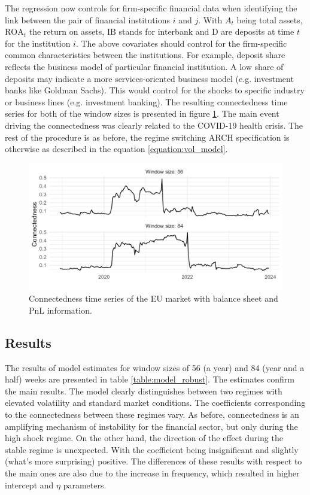 \documentclass[12pt]{article}
\begin{document}
The regression now controls for firm-specific financial data when identifying the link between the pair of financial institutions $i$ and $j$. With $A_t$ being total assets, $\text{ROA}_t$ the return on assets, $\text{IB}$ stands for interbank and $\text{D}$ are deposits at time $t$ for the institution $i$. The above covariates should control for the firm-specific common characteristics between the institutions. For example, deposit share reflects the business model of particular financial institution. A low share of deposits may indicate a more services-oriented business model (e.g. investment banks like Goldman Sachs). This would control for the shocks to specific industry or business lines (e.g. investment banking). The resulting connectedness time series for both of the window sizes is presented in figure \ref{figure:connect_bs}. The main event driving the connectedness was clearly related to the COVID-19 health crisis. The rest of the procedure is as before, the regime switching ARCH specification is otherwise as described in the equation \ref{equation:vol_model}.

\begin{figure}
	\centering
	\includegraphics[scale = 0.9]{img/connect_bs.png}
	\caption{Connectedness time series of the EU market with balance sheet and PnL information.}
	\label{figure:connect_bs}
\end{figure}

\subsection{Results}

The results of model estimates for window sizes of 56 (a year) and 84 (year and a half) weeks are presented in table \ref{table:model_robust}. The estimates confirm the main results. The model clearly distinguishes between two regimes with elevated volatility and standard market conditions. The coefficients corresponding to the connectedness between these regimes vary. As before, connectedness is an amplifying mechanism of instability for the financial sector, but only during the high shock regime. On the other hand, the direction of the effect during the stable regime is unexpected. With the coefficient being insignificant and slightly (what's more surprising) positive. The differences of these results with respect to the main ones are also due to the increase in frequency, which resulted in higher intercept and $\eta$ parameters.  
\end{document}

